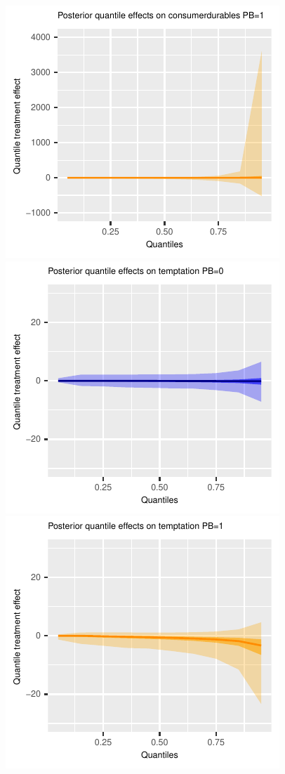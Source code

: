 \documentclass[AER]{AEA}
\begin{document}
\begin{figure}[h!]
    \includegraphics{posterior_parent_quantile_TEs_consumerdurables_pb_1_lognormal.pdf}\\
    \includegraphics{posterior_parent_quantile_TEs_temptation_pb_0_lognormal.pdf}
    \includegraphics{posterior_parent_quantile_TEs_temptation_pb_1_lognormal.pdf}\\

\end{figure}
\end{document}
